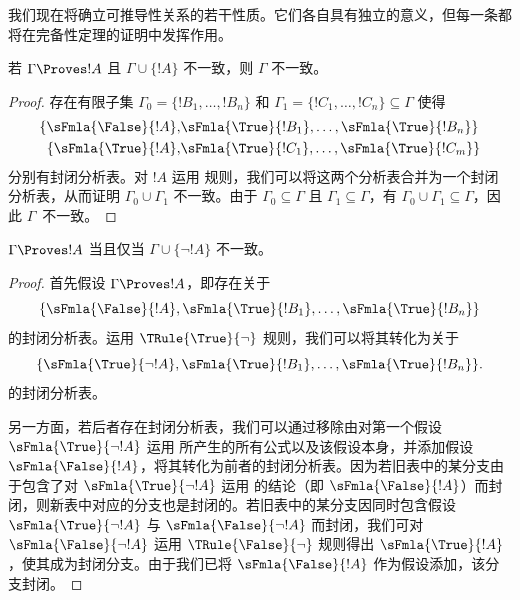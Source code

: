 \documentclass[../../../include/open-logic-section]{subfiles}
\begin{document}
      {}
      {}


我们现在将确立可推导性关系的若干性质。它们各自具有独立的意义，但每一条都将在完备性定理的证明中发挥作用。

\begin{prop}
  若 $\Gamma \Proves !A$ 且 $\Gamma \cup \{!A\}$ 不一致，则 $\Gamma$ 不一致。
\end{prop}

\begin{proof}
存在有限子集 $\Gamma_0 = \{!B_1, \dots, !B_n\}$ 和 $\Gamma_1
  =\{!C_1, \dots, !C_n\} \subseteq \Gamma$ 使得
  \begin{align*}
    \{\sFmla{\False}{!A}, &
    \sFmla{\True}{!B_1}, \dots, \sFmla{\True}{!B_n}\} \\
    \{\sFmla{\True}{!A}, &
    \sFmla{\True}{!C_1}, \dots, \sFmla{\True}{!C_m}\}
  \end{align*}
  分别有封闭分析表。对 $!A$ 运用 \Cut{} 规则，我们可以将这两个分析表合并为一个封闭分析表，从而证明 $\Gamma_0 \cup \Gamma_1$ 不一致。由于 $\Gamma_0 \subseteq \Gamma$ 且 $\Gamma_1 \subseteq \Gamma$，有 $\Gamma_0 \cup \Gamma_1 \subseteq \Gamma$，因此 $\Gamma$~不一致。
\end{proof}

\begin{prop}
$\Gamma \Proves !A$ 当且仅当 $\Gamma \cup \{\lnot !A\}$ 不一致。
\end{prop}

\begin{proof}
首先假设 $\Gamma \Proves !A$，即存在关于
\[
\{\sFmla{\False}{!A},
\sFmla{\True}{!B_1}, \dots, \sFmla{\True}{!B_n}\}
\]
的封闭分析表。运用 $\TRule{\True}{\lnot}$ 规则，我们可以将其转化为关于
\[
\{\sFmla{\True}{\lnot !A},
\sFmla{\True}{!B_1}, \dots, \sFmla{\True}{!B_n}\}.
\]
的封闭分析表。

另一方面，若后者存在封闭分析表，我们可以通过移除由对第一个假设~$\sFmla{\True}{\lnot !A}$ 运用 \TRule{\True}{\lnot} 所产生的所有公式以及该假设本身，并添加假设 $\sFmla{\False}{!A}$，将其转化为前者的封闭分析表。因为若旧表中的某分支由于包含了对 $\sFmla{\True}{\lnot !A}$ 运用 \TRule{\True}{\lnot} 的结论（即 $\sFmla{\False}{!A}$）而封闭，则新表中对应的分支也是封闭的。若旧表中的某分支因同时包含假设 $\sFmla{\True}{\lnot !A}$ 与 $\sFmla{\False}{\lnot !A}$ 而封闭，我们可对 $\sFmla{\False}{\lnot !A}$ 运用 $\TRule{\False}{\lnot}$ 规则得出 $\sFmla{\True}{!A}$，使其成为封闭分支。由于我们已将 $\sFmla{\False}{!A}$ 作为假设添加，该分支封闭。
\end{proof}
\end{document}
